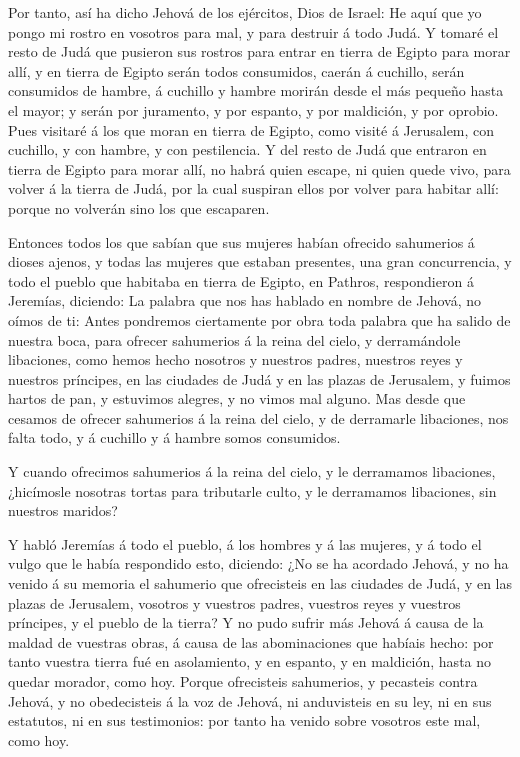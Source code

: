  Por tanto, así ha dicho Jehová de los ejércitos, Dios de
Israel: He aquí que yo pongo mi rostro en vosotros para mal, y para
destruir á todo Judá.  Y tomaré el resto de Judá que
pusieron sus rostros para entrar en tierra de Egipto para morar allí, y
en tierra de Egipto serán todos consumidos, caerán á cuchillo, serán
consumidos de hambre, á cuchillo y hambre morirán desde el más pequeño
hasta el mayor; y serán por juramento, y por espanto, y por maldición, y
por oprobio.  Pues visitaré á los que moran en tierra de
Egipto, como visité á Jerusalem, con cuchillo, y con hambre, y con
pestilencia.  Y del resto de Judá que entraron en tierra de
Egipto para morar allí, no habrá quien escape, ni quien quede vivo, para
volver á la tierra de Judá, por la cual suspiran ellos por volver para
habitar allí: porque no volverán sino los que escaparen.

 Entonces todos los que sabían que sus mujeres habían
ofrecido sahumerios á dioses ajenos, y todas las mujeres que estaban
presentes, una gran concurrencia, y todo el pueblo que habitaba en
tierra de Egipto, en Pathros, respondieron á Jeremías, diciendo:
 La palabra que nos has hablado en nombre de Jehová, no
oímos de ti:  Antes pondremos ciertamente por obra toda
palabra que ha salido de nuestra boca, para ofrecer sahumerios á la
reina del cielo, y derramándole libaciones, como hemos hecho nosotros y
nuestros padres, nuestros reyes y nuestros príncipes, en las ciudades de
Judá y en las plazas de Jerusalem, y fuimos hartos de pan, y estuvimos
alegres, y no vimos mal alguno.  Mas desde que cesamos de
ofrecer sahumerios á la reina del cielo, y de derramarle libaciones, nos
falta todo, y á cuchillo y á hambre somos consumidos.

 Y cuando ofrecimos sahumerios á la reina del cielo, y le
derramamos libaciones, ¿hicímosle nosotras tortas para tributarle culto,
y le derramamos libaciones, sin nuestros maridos?

 Y habló Jeremías á todo el pueblo, á los hombres y á las
mujeres, y á todo el vulgo que le había respondido esto, diciendo:
 ¿No se ha acordado Jehová, y no ha venido á su memoria el
sahumerio que ofrecisteis en las ciudades de Judá, y en las plazas de
Jerusalem, vosotros y vuestros padres, vuestros reyes y vuestros
príncipes, y el pueblo de la tierra?  Y no pudo sufrir más
Jehová á causa de la maldad de vuestras obras, á causa de las
abominaciones que habíais hecho: por tanto vuestra tierra fué en
asolamiento, y en espanto, y en maldición, hasta no quedar morador, como
hoy.  Porque ofrecisteis sahumerios, y pecasteis contra
Jehová, y no obedecisteis á la voz de Jehová, ni anduvisteis en su ley,
ni en sus estatutos, ni en sus testimonios: por tanto ha venido sobre
vosotros este mal, como hoy.

